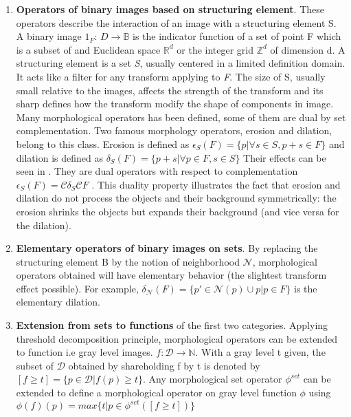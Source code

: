 \begin{enumerate}
\item \textbf{Operators of binary images based on structuring element}. These operators describe the interaction of an image with a structuring element S. A binary image $1_F$: $ D \rightarrow \mathbb{B} $ is the indicator function of a set of point F which is a subset of and Euclidean space $ \mathbb{R}^d $ or the integer grid $\mathbb{Z}^d$ of dimension d. A structuring element is a set \textit{S}, usually centered in a limited definition domain. It acts like a filter for any transform applying to \textit{F}. The size of S, usually small relative to the images, affects the strength of the transform and its sharp defines how the transform modify the shape of components in image. Many morphological operators has been defined, some of them are dual by set complementation. Two famous morphology operators, erosion and dilation, belong to this class. Erosion is defined as $ \epsilon_S (F) = \lbrace p  \vert  \forall s \in S, p + s \in F\rbrace $  and dilation is defined as $ \delta_S (F) = \lbrace p+s  \vert  \forall p \in F, s \in S\rbrace $ Their effects can be seen in . They are dual operators with respect to complementation $ \epsilon_S (F) = \mathcal{C} {\delta_{S}\mathcal{C}F} $ . This duality property illustrates the fact that erosion and dilation do not process the objects and their background symmetrically: the erosion shrinks the objects but expands their background (and vice versa for the dilation).
\item \textbf{Elementary operators of binary images  on sets}. By replacing the structuring element B by the notion of neighborhood $\mathcal{N}$, morphological operators obtained will have elementary behavior (the slightest transform effect possible). For example, $ \delta_\mathcal{N} (F) = \lbrace p' \in \mathcal{N}(p) \cup p  \vert  p \in F \rbrace $ is the elementary dilation.
\item \textbf{Extension from sets to functions} of the first two categories. Applying threshold decomposition principle, morphological operators can be extended to function i.e gray level images. $ f: \mathcal{D} \rightarrow \mathbb{N}$. With a gray level t given, the subset of $ \mathcal{D} $ obtained by shareholding f by t is denoted by $[f \geq t] = \lbrace p \in \mathcal{D} \vert f(p) \geq t \rbrace $. Any morphological set operator $\phi^{set}$ can be extended to define a morphological operator on gray level function $\phi$ using $ \phi(f)(p) = max \lbrace t \vert p \in \phi^{set}([f \geq t]) \rbrace $

\end{enumerate}
